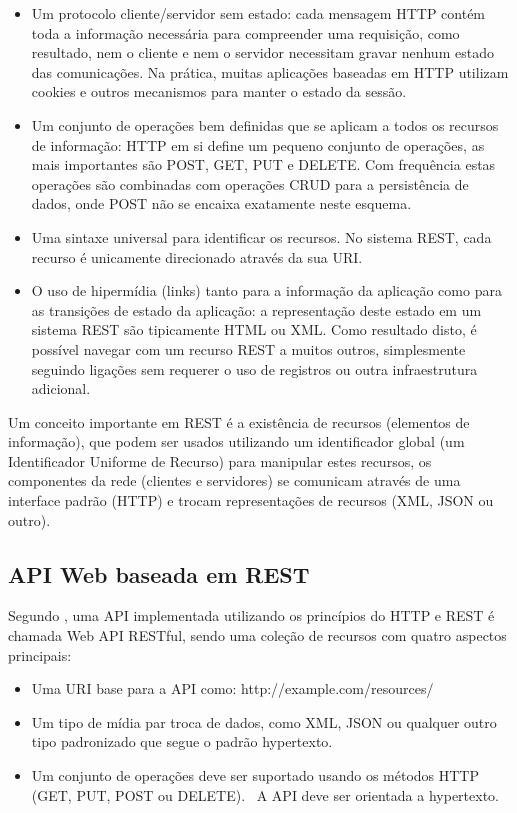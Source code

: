 \begin{itemize}
	\item Um protocolo cliente/servidor sem estado: cada mensagem HTTP contém toda a informação necessária para compreender uma requisição, como resultado, nem o cliente e nem o servidor necessitam gravar nenhum estado das comunicações. Na prática, muitas aplicações baseadas em HTTP utilizam cookies e outros mecanismos para manter o estado da sessão.
	\item	Um conjunto de operações bem definidas que se aplicam a todos os recursos de informação: HTTP em si define um pequeno conjunto de operações, as mais importantes são POST, GET, PUT e DELETE. Com frequência estas operações são combinadas com operações CRUD para a persistência de dados, onde POST não se encaixa exatamente neste esquema.
	\item	Uma sintaxe universal para identificar os recursos. No sistema REST, cada recurso é unicamente direcionado através da sua URI.
	\item	O uso de hipermídia (links) tanto para a informação da aplicação como para as transições de estado da aplicação: a representação deste estado em um sistema REST são tipicamente HTML ou XML. Como resultado disto, é possível navegar com um recurso REST a muitos outros, simplesmente seguindo ligações sem requerer o uso de registros ou outra infraestrutura adicional.
\end{itemize}

Um conceito importante em REST é a existência de recursos (elementos de informação), que podem ser usados utilizando um identificador global (um Identificador Uniforme de Recurso) para manipular estes recursos, os componentes da rede (clientes e servidores) se comunicam através de uma interface padrão (HTTP) e trocam representações de recursos (XML, JSON ou outro).

\subsection {API Web baseada em REST}

Segundo \textcite{w3c_ws:2004}, uma API implementada utilizando os princípios do HTTP e REST é chamada Web API RESTful, sendo uma coleção de recursos com quatro aspectos principais:

\begin{itemize}
	\item Uma URI base para a API como: http://example.com/resources/
	\item Um tipo de mídia par troca de dados, como XML, JSON ou qualquer outro tipo padronizado que segue o padrão hypertexto.
	\item Um conjunto de operações deve ser suportado usando os métodos HTTP (GET, PUT, POST ou DELETE).
	\ A API deve ser orientada a hypertexto.
\end{itemize}

